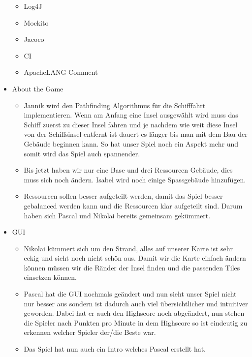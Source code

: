 \documentclass{scrartcl}
\begin{document}
\begin{itemize}
	\begin{itemize}
		\item Log4J
		\item Mockito
		\item Jacoco
		\item CI
		\item ApacheLANG Comment
	\end{itemize}
	\item About the Game
	\begin{itemize}
		\item Jannik wird den Pathfinding Algorithmus für die Schifffahrt implementieren. Wenn am Anfang eine Insel ausgewählt wird muss das Schiff zuerst zu dieser Insel fahren und je nachdem wie weit diese Insel von der Schiffsinsel entfernt ist dauert es länger bis man mit dem Bau der Gebäude beginnen kann. So hat unser Spiel noch ein Aspekt mehr und somit wird das Spiel auch spannender.
		\item Bis jetzt haben wir nur eine Base und drei Ressourcen Gebäude, dies muss sich noch ändern. Isabel wird noch einige Spassgebäude hinzufügen.
		\item Ressourcen sollen besser aufgeteilt werden, damit das Spiel besser gebalanced werden kann und die Ressourcen klar aufgeteilt sind. Darum haben sich Pascal und Nikolai bereits gemeinsam gekümmert. 
	\end{itemize}
	\item GUI
	\begin{itemize}
		\item Nikolai kümmert sich um den Strand, alles auf unserer Karte ist sehr eckig und sieht noch nicht schön aus. Damit wir die Karte einfach ändern können müssen wir die Ränder der Insel finden und die passenden Tiles einsetzen können. 
		\item Pascal hat die GUI nochmals geändert und nun sieht unser Spiel nicht nur besser aus sondern ist dadurch auch viel übersichtlicher und intuitiver geworden. Dabei hat er auch den Highscore noch abgeändert, nun stehen die Spieler nach Punkten pro Minute in dem Highscore so ist eindeutig zu erkennen welcher Spieler der/die Beste war.
		\item Das Spiel hat nun auch ein Intro welches Pascal erstellt hat. 
	\end{itemize}
\end{itemize}
\end{document}
